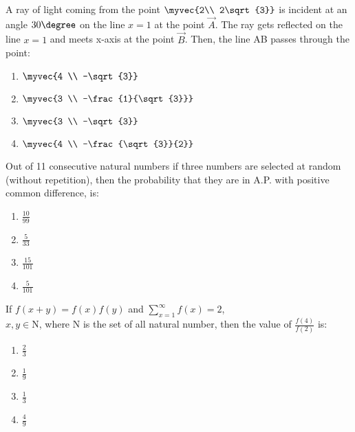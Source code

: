 \item  A ray of light coming from the point $\myvec{2\\ 2\sqrt{3}}$ is incident at an angle $30\degree$ on the line $x = 1$ at the point $\vec{A}$. The ray gets reflected on the line $x = 1$ and meets x-axis at the point $\vec{B}$. Then, the line AB passes through the point:\hfill{}
\begin{multicols}{4}
\begin{enumerate}
\item $\myvec{4 \\ -\sqrt{3}}$
\item $\myvec{3 \\ -\frac{1}{\sqrt{3}}}$
\item $\myvec{3 \\ -\sqrt{3}}$
\item $\myvec{4 \\ -\frac{\sqrt{3}}{2}}$
\end{enumerate}
\end{multicols}

\item Out of 11 consecutive natural numbers if three numbers are selected at random (without repetition), then the probability that they are in A.P. with positive common difference, is:\hfill{}

\begin{multicols}{4}
\begin{enumerate}
\item $\frac{10}{99}$
\item $\frac{5}{33}$
\item $\frac{15}{101}$
\item $\frac{5}{101}$
\end{enumerate}
\end{multicols}

\item  If $f(x + y) = f(x) f(y)$ and $\sum_{x=1}^{\infty} f(x) = 2$,\\
$x, y \in $N, where N is the set of all natural number, then the value of $\frac{f(4)}{f(2)}$ is:

\hfill{}

\begin{multicols}{4}
\begin{enumerate}
\item $\frac{2}{3}$
\item $\frac{1}{9}$
\item $\frac{1}{3}$
\item $\frac{4}{9}$
\end{enumerate}
\end{multicols}

